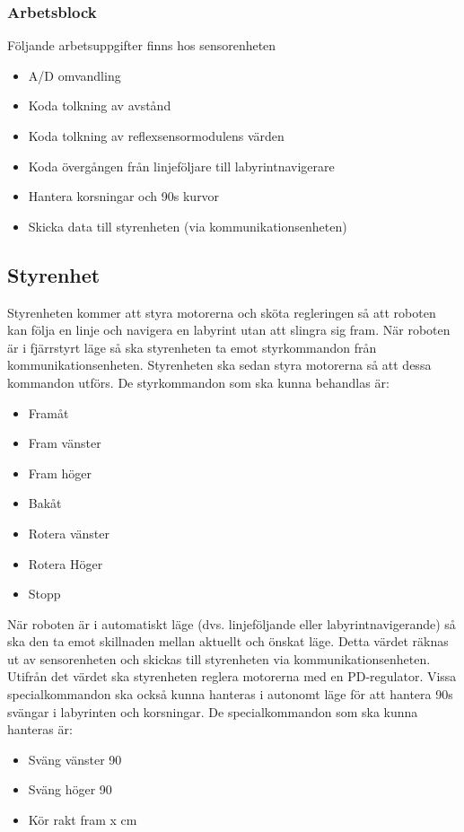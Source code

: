 \documentclass[a4paper,12pt]{article}
\begin{document}
\subsubsection{Arbetsblock}
Följande arbetsuppgifter finns hos sensorenheten
\begin{itemize}
        \item A/D omvandling
        \item Koda tolkning av avstånd
        \item Koda tolkning av reflexsensormodulens värden
        \item Koda övergången från linjeföljare till labyrintnavigerare
        \item Hantera korsningar och 90\degree s kurvor
        \item Skicka data till styrenheten (via kommunikationsenheten)
\end{itemize}

\subsection{Styrenhet}
Styrenheten kommer att styra motorerna och sköta regleringen så att roboten kan följa en linje och navigera en labyrint utan att slingra sig fram.
När roboten är i fjärrstyrt läge så ska styrenheten ta emot styrkommandon från kommunikationsenheten.
Styrenheten ska sedan styra motorerna så att dessa kommandon utförs. De styrkommandon som ska kunna behandlas är:
\begin{itemize}
        \item Framåt
        \item Fram vänster
        \item Fram höger
        \item Bakåt
        \item Rotera vänster
        \item Rotera Höger
        \item Stopp
\end{itemize}

När roboten är i automatiskt läge (dvs. linjeföljande eller labyrintnavigerande) så ska den ta emot skillnaden mellan aktuellt och önskat läge.
Detta värdet räknas ut av sensorenheten och skickas till styrenheten via kommunikationsenheten.
Utifrån det värdet ska styrenheten reglera motorerna med en PD-regulator. Vissa specialkommandon ska också kunna hanteras i autonomt läge 
för att hantera 90\degree s svängar i labyrinten och korsningar. De specialkommandon som ska kunna hanteras är:
\begin{itemize}
        \item Sväng vänster 90\degree
        \item Sväng höger 90\degree
        \item Kör rakt fram x cm
\end{itemize}
\end{document}
